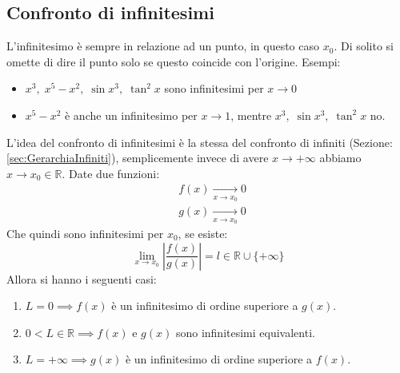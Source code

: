 \subsection{Confronto di infinitesimi}
L'infinitesimo è sempre in relazione ad un punto, in questo caso $x_0$. Di solito si omette di dire il punto solo se questo coincide con l'origine. Esempi:
\begin{itemize}
	\item $x^3,\; x^5 - x^2,\; \sin{x^3},\; \tan^2{x}$ sono infinitesimi per $x \to 0$
	
	\item $x^5 - x^2$ è anche un infinitesimo per $x \to 1$, mentre $x^3,\; \sin{x^3},\; \tan^2{x}$ no.
\end{itemize}

L'idea del confronto di infinitesimi è la stessa del confronto di infiniti (Sezione: \ref{sec:GerarchiaInfiniti}), semplicemente invece di avere $x \to +\infty$ abbiamo $x \to x_0 \in \mathbb{R}$. Date due funzioni:
\begin{align*}
	&f(x) \xrightarrow[x \to x_0]{} 0\\
	&g(x) \xrightarrow[x \to x_0]{} 0
\end{align*}
Che quindi sono infinitesimi per $x_0$, se esiste:
\begin{equation*}
	\lim_{x \to x_0} \left| \dfrac{f(x)}{g(x)} \right| = l \in \mathbb{R} \cup \{+\infty\}
\end{equation*}
Allora si hanno i seguenti casi:
\begin{enumerate}
	\item $L = 0 \implies f(x)$ è un infinitesimo di ordine superiore a $g(x)$.

	\item $0 < L \in \mathbb{R} \implies f(x)$ e $g(x)$ sono infinitesimi equivalenti.

	\item $L = +\infty \implies g(x)$ è un infinitesimo di ordine superiore a $f(x)$.
\end{enumerate}

